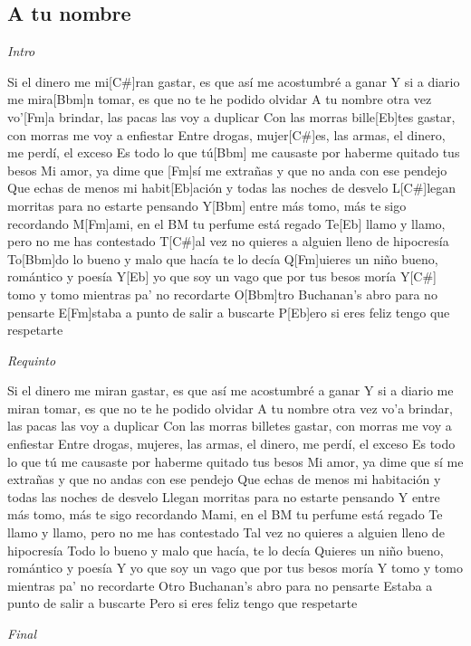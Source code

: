 \subsection{A tu nombre}
\noindent

\vspace{1cm}

\begin{guitar}
	\begin{multicols}{2}

		\textit{Intro}

		Si el dinero me mi[C#]ran gastar, es que así me
	acostumbré a ganar
	Y si a diario me mira[Bbm]n tomar, es que no te he
	podido olvidar
	A tu nombre otra vez vo'[Fm]a brindar, las pacas
	las voy a duplicar
	Con las morras bille[Eb]tes gastar, con morras me
	voy a enfiestar
	Entre drogas, mujer[C#]es, las armas, el dinero,
	me perdí, el exceso
	Es todo lo que tú[Bbm] me causaste por haberme
	quitado tus besos
	Mi amor, ya dime que [Fm]sí me extrañas y que no
	anda con ese pendejo
	Que echas de menos mi habit[Eb]ación y todas las
	noches de desvelo
	L[C#]legan morritas para no estarte pensando
	Y[Bbm] entre más tomo, más te sigo recordando
	M[Fm]ami, en el BM tu perfume está regado
	Te[Eb] llamo y llamo, pero no me has contestado
	T[C#]al vez no quieres a alguien lleno de hipocresía
	To[Bbm]do lo bueno y malo que hacía te lo decía
	Q[Fm]uieres un niño bueno, romántico y poesía
	Y[Eb] yo que soy un vago que por tus besos moría
	Y[C#] tomo y tomo mientras pa' no recordarte
	O[Bbm]tro Buchanan's abro para no pensarte
	E[Fm]staba a punto de salir a buscarte
	P[Eb]ero si eres feliz tengo que respetarte
	\par
	\textit{Requinto}

	Si el dinero me miran gastar, es que así me
	acostumbré a ganar
	Y si a diario me miran tomar, es que no te he
	podido olvidar
	A tu nombre otra vez vo'a brindar, las pacas las
	voy a duplicar
	Con las morras billetes gastar, con morras me
	voy a enfiestar
	Entre drogas, mujeres, las armas, el dinero,
	me perdí, el exceso
	Es todo lo que tú me causaste por haberme
	quitado tus besos
	Mi amor, ya dime que sí me extrañas y que no
	andas con ese pendejo
	Que echas de menos mi habitación y todas las
	noches de desvelo
	Llegan morritas para no estarte pensando
	Y entre más tomo, más te sigo recordando
	Mami, en el BM tu perfume está regado
	Te llamo y llamo, pero no me has contestado
	Tal vez no quieres a alguien lleno de hipocresía
	Todo lo bueno y malo que hacía, te lo decía
	Quieres un niño bueno, romántico y poesía
	Y yo que soy un vago que por tus besos moría
	Y tomo y tomo mientras pa' no recordarte
	Otro Buchanan's abro para no pensarte
	Estaba a punto de salir a buscarte
	Pero si eres feliz tengo que respetarte
	\par
		\textit{Final}
	\end{multicols}
\end{guitar}

